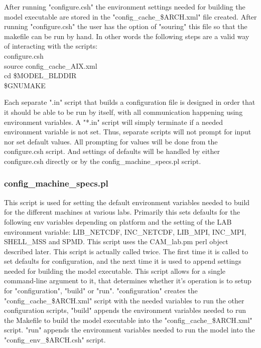 \documentclass[]{article}
\begin{document}
After running "configure.csh" the environment settings needed for
building the model executable are stored in the "config\_cache\_\$ARCH.xml"
file created. After running "configure.csh" the user has the option
of "souring" this file so that the makefile can be run by hand. In
other words the following steps are a valid way of interacting with
the scripts:\\

{\ttfamily
configure.csh\\
source config\_cache\_AIX.xml\\
cd \$MODEL\_BLDDIR\\
\$GNUMAKE\\
}

Each separate ".in" script that builds a configuration file is designed in
order that it should be able to be run by itself, with all communication happening 
using environment variables. A "*.in" script will simply terminate if a needed
environment variable is not set. Thus, separate scripts will not prompt for
input nor set default values. All prompting for values will be done from the
configure.csh script. And settings of defaults will be handled by either configure.csh
directly or by the config\_machine\_specs.pl script.

\subsubsection{config\_machine\_specs.pl}

This script is used for setting the default environment variables needed to build for the
different machines at various labs. Primarily this sets defaults for the
following env variables depending on platform and the setting of the LAB environment 
variable: LIB\_NETCDF, INC\_NETCDF, LIB\_MPI, INC\_MPI, SHELL\_MSS and SPMD. 
This script uses the CAM\_lab.pm
perl object described later. This script is actually called twice. The
first time it is called to set defaults for configuration, and the next
time it is used to append settings needed for building the model executable.
This script allows for a single command-line argument to it, that determines
whether it's operation is to setup for "configuration", "build" or "run".
"configuration" creates the "config\_cache\_\$ARCH.xml" script with the needed
variables to run the other configuration scripts, "build" appends the environment variables 
needed to run the Makefile to build the model executable into the "config\_cache\_\$ARCH.xml" 
script. "run" appends the environment variables needed to run the model into the 
"config\_env\_\$ARCH.csh" script.
\end{document}
